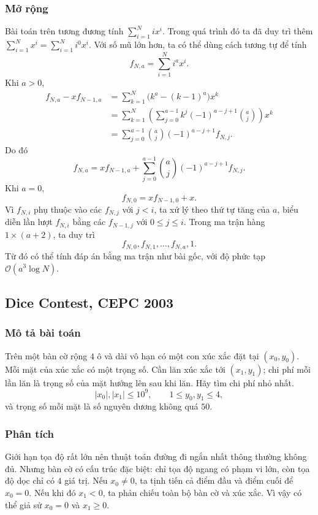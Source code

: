 \documentclass[11pt]{article}
\newcommand{\Oh}{\mathcal{O}}
\begin{document}
\subsubsection{Mở rộng}

Bài toán trên tương đương tính \(\sum_{i=1}^{N} i x^i\). Trong quá trình đó ta
đã duy trì thêm \(\sum_{i=1}^{N}x^i=\sum_{i=1}^{N}i^0x^i\). Với số mũ lớn hơn,
ta có thể dùng cách tương tự để tính
\[
  f_{N,a}=\sum_{i=1}^{N}i^a x^i.
\]
Khi \(a>0\),
\[
\begin{aligned}
  f_{N,a}-xf_{N-1,a}
  &=\sum_{k=1}^{N}\bigl(k^a-(k-1)^a\bigr)x^k\\
  &=\sum_{k=1}^{N}\left(
      \sum_{j=0}^{a-1} k^j(-1)^{a-j+1}\binom{a}{j}
    \right)x^k\\
  &=\sum_{j=0}^{a-1}\binom{a}{j}(-1)^{a-j+1}f_{N,j}.
\end{aligned}
\]
Do đó
\[
  f_{N,a}=xf_{N-1,a}
  +\sum_{j=0}^{a-1}\binom{a}{j}(-1)^{a-j+1}f_{N,j}.
\]
Khi \(a=0\),
\[
  f_{N,0}=xf_{N-1,0}+x.
\]
Vì \(f_{N,i}\) phụ thuộc vào các \(f_{N,j}\) với \(j<i\), ta xử lý theo thứ tự
tăng của \(a\), biểu diễn lần lượt \(f_{N,i}\) bằng các \(f_{N-1,j}\) với
\(0\le j\le i\). Trong ma trận hàng \(1\times(a+2)\), ta duy trì
\[
  f_{N,0},f_{N,1},\ldots,f_{N,a},1.
\]
Từ đó có thể tính đáp án bằng ma trận như bài gốc, với độ phức tạp
\(\Oh(a^3\log N)\).

\subsection{Dice Contest, CEPC 2003}

\subsubsection{Mô tả bài toán}

Trên một bàn cờ rộng \(4\) ô và dài vô hạn có một con xúc xắc đặt tại
\((x_0,y_0)\). Mỗi mặt của xúc xắc có một trọng số. Cần lăn xúc xắc tới
\((x_1,y_1)\); chi phí mỗi lần lăn là trọng số của mặt hướng lên sau khi lăn.
Hãy tìm chi phí nhỏ nhất.
\[
  |x_0|,|x_1|\le 10^9,\qquad 1\le y_0,y_1\le 4,
\]
và trọng số mỗi mặt là số nguyên dương không quá \(50\).

\subsubsection{Phân tích}

Giới hạn tọa độ rất lớn nên thuật toán đường đi ngắn nhất thông thường không
đủ. Nhưng bàn cờ có cấu trúc đặc biệt: chỉ tọa độ ngang có phạm vi lớn, còn
tọa độ dọc chỉ có \(4\) giá trị. Nếu \(x_0\ne 0\), ta tịnh tiến cả điểm đầu
và điểm cuối để \(x_0=0\). Nếu khi đó \(x_1<0\), ta phản chiếu toàn bộ bàn cờ
và xúc xắc. Vì vậy có thể giả sử \(x_0=0\) và \(x_1\ge 0\).
\end{document}
